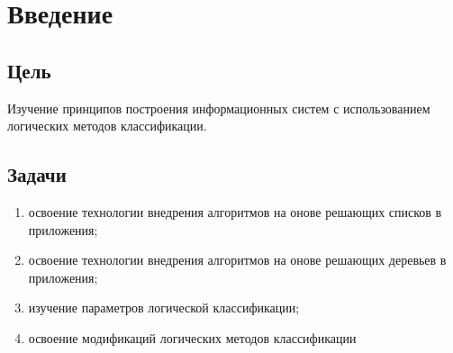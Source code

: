 \chapter{Введение}
\label{ch:intro}

\section{Цель}  

Изучение принципов построения
информационных систем с использованием логических методов
классификации.


 
\section{Задачи}

\begin{enumerate} 
\item  освоение технологии внедрения алгоритмов на онове решающих
списков в приложения;
\item освоение технологии внедрения алгоритмов на онове решающих деревьев в приложения;
\item изучение параметров логической классификации;
\item освоение модификаций логических методов классификации
\end{enumerate}
   

\endinput 